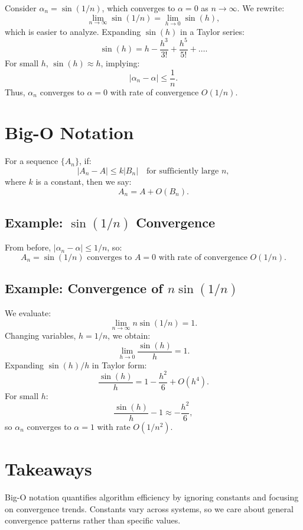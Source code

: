 Consider $\alpha_n = \sin(1/n)$, which converges to $\alpha = 0$ as $n \to \infty$.
We rewrite:
\begin{equation*}
    \lim_{n \to \infty} \sin(1/n) = \lim_{h \to 0} \sin(h),
\end{equation*}
which is easier to analyze. Expanding $\sin(h)$ in a Taylor series:
\begin{equation*}
    \sin(h) = h - \frac{h^3}{3!} + \frac{h^5}{5!} + \dots.
\end{equation*}
For small $h$, $\sin(h) \approx h$, implying:
\begin{equation*}
    |\alpha_n - \alpha| \leq \frac{1}{n}.
\end{equation*}
Thus, $\alpha_n$ converges to $\alpha = 0$ with rate of convergence $O(1/n)$.

\section{Big-O Notation}

For a sequence $\{A_n\}$, if:
\begin{equation*}
    |A_n - A| \leq k |B_n| \quad \text{for sufficiently large } n,
\end{equation*}
where $k$ is a constant, then we say:
\begin{equation*}
    A_n = A + O(B_n).
\end{equation*}

\subsection{Example: $\sin(1/n)$ Convergence}

From before, $|\alpha_n - \alpha| \leq 1/n$, so:
\begin{equation*}
    A_n = \sin(1/n) \text{ converges to } A = 0 
    \text{ with rate of convergence } O(1/n).
\end{equation*}

\subsection{Example: Convergence of $n \sin(1/n)$}

We evaluate:
\begin{equation*}
    \lim_{n \to \infty} n \sin(1/n) = 1.
\end{equation*}
Changing variables, $h = 1/n$, we obtain:
\begin{equation*}
    \lim_{h \to 0} \frac{\sin(h)}{h} = 1.
\end{equation*}
Expanding $\sin(h)/h$ in Taylor form:
\begin{equation*}
    \frac{\sin(h)}{h} = 1 - \frac{h^2}{6} + O(h^4).
\end{equation*}
For small $h$:
\begin{equation*}
    \frac{\sin(h)}{h} - 1 \approx -\frac{h^2}{6},
\end{equation*}
so $\alpha_n$ converges to $\alpha = 1$ with rate $O(1/n^2)$.

\section{Takeaways}

Big-O notation quantifies algorithm efficiency by ignoring constants and focusing 
on convergence trends. Constants vary across systems, so we care about general 
convergence patterns rather than specific values.

